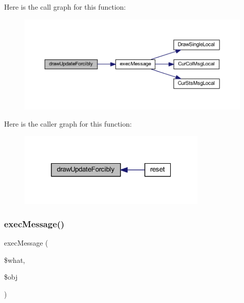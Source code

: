 Here is the call graph for this function\+:
\nopagebreak
\begin{figure}[H]
\begin{center}
\leavevmode
\includegraphics[width=350pt]{class_reversi_play_a3ae28eb121caf59932218ea7d1fca81d_cgraph}
\end{center}
\end{figure}
Here is the caller graph for this function\+:
\nopagebreak
\begin{figure}[H]
\begin{center}
\leavevmode
\includegraphics[width=256pt]{class_reversi_play_a3ae28eb121caf59932218ea7d1fca81d_icgraph}
\end{center}
\end{figure}
\mbox{\label{class_reversi_play_ae8beea2648c1c5cf722364e84a90edf9}} 
\subsubsection{\texorpdfstring{exec\+Message()}{execMessage()}}
{\footnotesize\ttfamily exec\+Message (\begin{DoxyParamCaption}\item[{}]{\$what,  }\item[{}]{\$obj }\end{DoxyParamCaption})\hspace{0.3cm}{\ttfamily [private]}}



